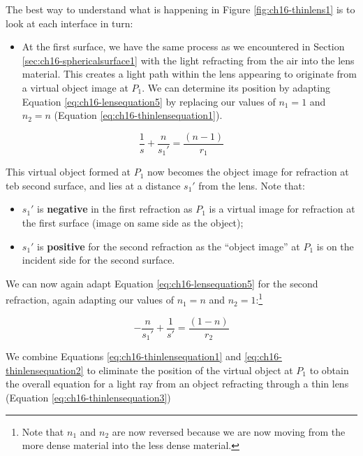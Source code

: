 \documentclass[
]{book}
\providecommand{\tightlist}{%
  \setlength{\itemsep}{0pt}\setlength{\parskip}{0pt}}
\begin{document}
The best way to understand what is happening in Figure \ref{fig:ch16-thinlens1} is to look at each interface in turn:

\begin{itemize}
\tightlist
\item
  At the first surface, we have the same process as we encountered in Section \ref{sec:ch16-sphericalsurface1} with the light refracting from the air into the lens material. This creates a light path within the lens appearing to originate from a virtual object image at \(P_1\). We can determine its position by adapting Equation \eqref{eq:ch16-lensequation5} by replacing our values of \(n_1 = 1\) and \(n_2 = n\) (Equation \eqref{eq:ch16-thinlensequation1}).
\end{itemize}

\begin{equation}
\frac{1}{s} + \frac{n}{s_1'} = \frac{(n - 1)}{r_1}
\label{eq:ch16-thinlensequation1}
\end{equation}

This virtual object formed at \(P_1\) now becomes the object image for refraction at teb second surface, and lies at a distance \(s_1'\) from the lens. Note that:

\begin{itemize}
\tightlist
\item
  \(s_1'\) is \textbf{negative} in the first refraction as \(P_1\) is a virtual image for refraction at the first surface (image on same side as the object);
\item
  \(s_1'\) is \textbf{positive} for the second refraction as the ``object image'' at \(P_1\) is on the incident side for the second surface.
\end{itemize}

We can now again adapt Equation \eqref{eq:ch16-lensequation5} for the second refraction, again adapting our values of \(n_1 = n\) and \(n_2 = 1\):\footnote{Note that \(n_1\) and \(n_2\) are now reversed because we are now moving from the more dense material into the less dense material.}

\begin{equation}
-\frac{n}{s_1'} + \frac{1}{s'} = \frac{(1 - n)}{r_2}
\label{eq:ch16-thinlensequation2}
\end{equation}

We combine Equations \eqref{eq:ch16-thinlensequation1} and \eqref{eq:ch16-thinlensequation2} to eliminate the position of the virtual object at \(P_1\) to obtain the overall equation for a light ray from an object refracting through a thin lens (Equation \eqref{eq:ch16-thinlensequation3})
\end{document}
